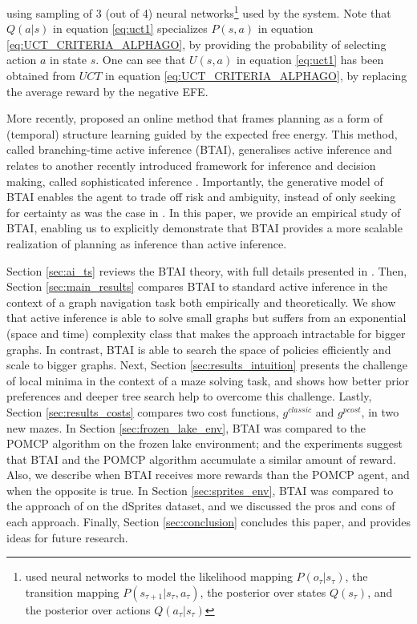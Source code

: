 \documentclass[twoside,11pt]{article}
\begin{document}
using sampling of 3 (out of 4) neural networks\footnote{\citet{DeepAIwithMCMC} used neural networks to model the likelihood mapping $P(o_\tau|s_\tau)$, the transition mapping $P(s_{\tau+1}|s_\tau,a_\tau)$, the posterior over states $Q(s_\tau)$, and the posterior over actions $Q(a_\tau|s_\tau)$} used by the system. Note that $Q(a|s)$ in equation \eqref{eq:uct1} specializes $P(s,a)$ in equation \eqref{eq:UCT_CRITERIA_ALPHAGO}, by providing the probability of selecting action $a$ in state $s$. One can see that $U(s, a)$ in equation \eqref{eq:uct1} has been obtained from $UCT$ in equation \eqref{eq:UCT_CRITERIA_ALPHAGO}, by replacing the average reward by the negative EFE.

More recently, \citet{AITS_THEORY} proposed an online method that frames planning as a form of (temporal) structure learning guided by the expected free energy. This method, called branching-time active inference (BTAI), generalises active inference \citep{FRISTON2016862,AI_VMP,AI_TUTO} and relates to another recently introduced framework for inference and decision making, called sophisticated inference \citep{sophisticated}. Importantly, the generative model of BTAI enables the agent to trade off risk and ambiguity, instead of only seeking for certainty as was the case in \citep{AI_VMP}. In this paper, we provide an empirical study of BTAI, enabling us to explicitly demonstrate that BTAI provides a more scalable realization of planning as inference than active inference.

Section \ref{sec:ai_ts} reviews the BTAI theory, with full details presented in \citep{AITS_THEORY}. Then, Section \ref{sec:main_results} compares BTAI to standard active inference in the context of a graph navigation task both empirically and theoretically. We show that active inference is able to solve small graphs but suffers from an exponential (space and time) complexity class that makes the approach intractable for bigger graphs. In contrast, BTAI is able to search the space of policies efficiently and scale to bigger graphs. Next, Section \ref{sec:results_intuition} presents the challenge of local minima in the context of a maze solving task, and shows how better prior preferences and deeper tree search help to overcome this challenge. Lastly, Section \ref{sec:results_costs} compares two cost functions, $g^{classic}$ and $g^{pcost}$, in two new mazes. In Section \ref{sec:frozen_lake_env}, BTAI was compared to the POMCP algorithm \citep{POMCP} on the frozen lake environment; and the experiments suggest that BTAI and the POMCP algorithm accumulate a similar amount of reward. Also, we describe when BTAI receives more rewards than the POMCP agent, and when the opposite is true. In Section \ref{sec:sprites_env}, BTAI was compared to the approach of \citet{DeepAIwithMCMC} on the dSprites dataset, and we discussed the pros and cons of each approach. Finally, Section \ref{sec:conclusion} concludes this paper, and provides ideas for future research.
\end{document}
